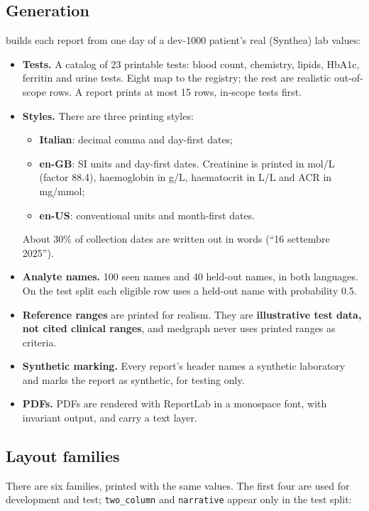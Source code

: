 \documentclass[11pt,a4paper]{article}
\newcommand{\code}[1]{\texttt{\detokenize{#1}}}
\begin{document}
\subsection{Generation}
\code{scripts/generate_lab_reports.py} builds each report from one day of a dev-1000 patient's real (Synthea) lab values:
\begin{itemize}
  \item \textbf{Tests.} A catalog of 23 printable tests: blood count, chemistry, lipids, HbA1c, ferritin and urine tests. Eight map to the registry; the rest are realistic out-of-scope rows. A report prints at most 15 rows, in-scope tests first.
  \item \textbf{Styles.} There are three printing styles:
  \begin{itemize}
    \item \textbf{Italian}: decimal comma and day-first dates;
    \item \textbf{en-GB}: SI units and day-first dates. Creatinine is printed in \textmu mol/L (factor 88.4), haemoglobin in g/L, haematocrit in L/L and ACR in mg/mmol;
    \item \textbf{en-US}: conventional units and month-first dates.
  \end{itemize}
  About 30\% of collection dates are written out in words (``16 settembre 2025'').
  \item \textbf{Analyte names.} 100 seen names and 40 held-out names, in both languages. On the test split each eligible row uses a held-out name with probability 0.5.
  \item \textbf{Reference ranges} are printed for realism. They are \textbf{illustrative test data, not cited clinical ranges}, and medgraph never uses printed ranges as criteria.
  \item \textbf{Synthetic marking.} Every report's header names a synthetic laboratory and marks the report as synthetic, for testing only.
  \item \textbf{PDFs.} PDFs are rendered with ReportLab in a monospace font, with invariant output, and carry a text layer.
\end{itemize}

\subsection{Layout families}
There are six families, printed with the same values. The first four are used for development and test; \texttt{two\_column} and \texttt{narrative} appear only in the test split:
\end{document}
